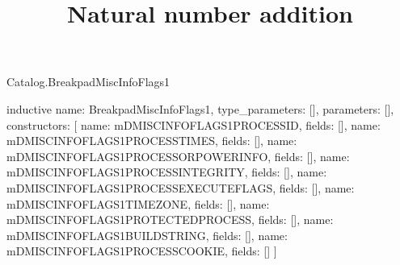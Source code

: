 \begin{lexlean}{Catalog.BreakpadMiscInfoFlags1}
\title{Natural number addition}
\begin{semanticmodule}
inductive{
  name: BreakpadMiscInfoFlags1,
  type_parameters: [],
  parameters: [],
  constructors: [
    {name: mDMISCINFOFLAGS1PROCESSID, fields: []},
    {name: mDMISCINFOFLAGS1PROCESSTIMES, fields: []},
    {name: mDMISCINFOFLAGS1PROCESSORPOWERINFO, fields: []},
    {name: mDMISCINFOFLAGS1PROCESSINTEGRITY, fields: []},
    {name: mDMISCINFOFLAGS1PROCESSEXECUTEFLAGS, fields: []},
    {name: mDMISCINFOFLAGS1TIMEZONE, fields: []},
    {name: mDMISCINFOFLAGS1PROTECTEDPROCESS, fields: []},
    {name: mDMISCINFOFLAGS1BUILDSTRING, fields: []},
    {name: mDMISCINFOFLAGS1PROCESSCOOKIE, fields: []}
  ]
}
\end{semanticmodule}
\end{lexlean}
